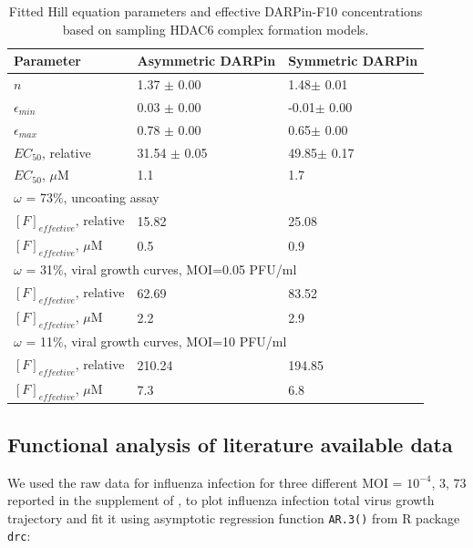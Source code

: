 \begin{table}[h!]
\centering
\caption[Fitted Hill equation parameters and effective DARPin-F10 concentrations]{Fitted Hill equation parameters and effective DARPin-F10 concentrations based on sampling HDAC6 complex formation models.}
\label{table:DARPinFittingCoefficients}

\begin{tabular}{p{5cm} p{3cm} p{3cm}}
\hline 
\textbf{Parameter} & \textbf{Asymmetric DARPin} & \textbf{Symmetric DARPin}\\
\hline
$n$ &                 1.37 $\pm$ 0.00 &    1.48$\pm$ 0.01\\
$\epsilon_{min}$ &    0.03 $\pm$ 0.00 &    -0.01$\pm$ 0.00\\
$\epsilon_{max}$ &    0.78 $\pm$ 0.00 &    0.65$\pm$ 0.00\\
$EC_{50}$, relative &          31.54 $\pm$ 0.05&    49.85$\pm$ 0.17\\
$EC_{50}$, $\mu$M &          1.1&    1.7\\
\hline
\multicolumn{3}{l}{$\omega$ = 73\%, uncoating assay}\\
$[F]_{effective}$, relative & 15.82 & 25.08\\
$[F]_{effective}$, $\mu$M & 0.5 & 0.9\\
\hline
\multicolumn{3}{l}{$\omega$ = 31\%, viral growth curves, MOI=0.05 PFU/ml}\\
$[F]_{effective}$, relative & 62.69 & 83.52\\
$[F]_{effective}$, $\mu$M & 2.2 & 2.9\\
\hline
\multicolumn{3}{l}{$\omega$ = 11\%, viral growth curves, MOI=10 PFU/ml}\\
$[F]_{effective}$, relative & 210.24 & 194.85\\
$[F]_{effective}$, $\mu$M & 7.3 & 6.8\\
\hline
\end{tabular}
\end{table}

\subsection{Functional analysis of literature available data}

We used the raw data for influenza infection for three different MOI = $10^{-4}$, $3$, $73$ reported in the supplement of \cite{rudiger2019multiscale}, to plot influenza infection total virus growth trajectory and fit it using asymptotic regression function \texttt{AR.3()} from R package \texttt{drc}:

